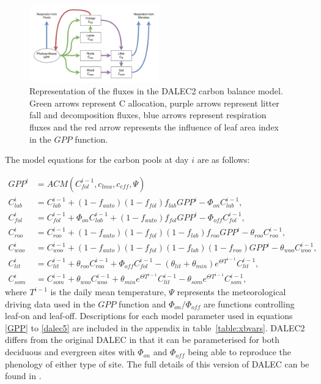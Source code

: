 \documentclass[review]{elsarticle}
\begin{document}
\begin{figure}[ht]
    \centering
    \includegraphics[width=0.5\textwidth]{dalec2diag.pdf}
    \caption{Representation of the fluxes in the DALEC2 carbon balance model. Green arrows represent C allocation, purple arrows represent litter fall and decomposition fluxes, blue arrows represent respiration fluxes and the red arrow represents the influence of leaf area index in the $GPP$ function.} \label{fig:DALEC_mod}
\end{figure}

The model equations for the carbon pools at day $i$ are as follows:

\begin{align}
GPP^{i} &= ACM(C_{fol}^{i-1}, c_{lma}, c_{eff}, \Psi) \label{GPP}
\\C_{lab}^{i}&=C_{lab}^{i-1}+(1-f_{auto})(1-f_{fol})f_{lab}GPP^{i}-\Phi _{on}C_{lab}^{i-1}, \label{daleclab}
\\C_{fol}^{i}&=C_{fol}^{i-1}+\Phi_{on}C_{lab}^{i-1}+(1-f_{auto})f_{fol}GPP^{i}-\Phi_{off}C_{fol}^{i-1}, \label{dalec1}
\\C_{roo}^{i}&=C_{roo}^{i-1}+(1-f_{auto})(1-f_{fol})(1-f_{lab})f_{roo}GPP^{i}-\theta_{roo}C_{roo}^{i-1}, 
\\C_{woo}^{i}&=C_{woo}^{i-1}+(1-f_{auto})(1-f_{fol})(1-f_{lab})(1-f_{roo})GPP^{i}-\theta_{woo}C_{woo}^{i-1}, 
\\C_{lit}^{i}&=C_{lit}^{i-1}+\theta_{roo}C_{roo}^{i-1}+\Phi_{off}C_{fol}^{i-1}-(\theta_{lit}+\theta_{min})e^{\Theta T^{i-1}}C_{lit}^{i-1}, 
\\C_{som}^{i}&=C_{som}^{i-1}+\theta_{woo}C_{woo}^{i-1}+\theta_{min}e^{\Theta T^{i-1}}C_{lit}^{i-1}-\theta_{som}e^{\Theta T^{i-1}}C_{som}^{i-1}, \label{dalec5}
\end{align}
where $T^{i-1}$ is the daily mean temperature, $\Psi$ represents the meteorological driving data used in the $GPP$ function and $\Phi_{on} / \Phi_{off}$ are functions controlling leaf-on and leaf-off. Descriptions for each model parameter used in equations \eqref{GPP} to \eqref{dalec5} are included in the appendix in table~\ref{table:xbvars}. DALEC2 differs from the original DALEC in that it can be parameterised for both deciduous and evergreen sites with $\Phi_{on}$ and $\Phi_{off}$ being able to reproduce the phenology of either type of site. The full details of this version of DALEC can be found in \cite{Bloom2015}. 
\end{document}
